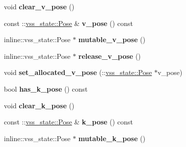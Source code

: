\begin{DoxyCompactItemize}
\item 
void {\bfseries clear\+\_\+v\+\_\+pose} ()\hypertarget{classvss__state_1_1Robot__State_ad7bb63ae44945655a400d71825c4e6cc}{}\label{classvss__state_1_1Robot__State_ad7bb63ae44945655a400d71825c4e6cc}

\item 
const \+::\hyperlink{classvss__state_1_1Pose}{vss\+\_\+state\+::\+Pose} \& {\bfseries v\+\_\+pose} () const \hypertarget{classvss__state_1_1Robot__State_af05253d869ead02f02a8ea56f0ec989f}{}\label{classvss__state_1_1Robot__State_af05253d869ead02f02a8ea56f0ec989f}

\item 
inline\+::vss\+\_\+state\+::\+Pose $\ast$ {\bfseries mutable\+\_\+v\+\_\+pose} ()\hypertarget{classvss__state_1_1Robot__State_ad5bd41bfe20e17c7c35a1cd91ff24a4a}{}\label{classvss__state_1_1Robot__State_ad5bd41bfe20e17c7c35a1cd91ff24a4a}

\item 
inline\+::vss\+\_\+state\+::\+Pose $\ast$ {\bfseries release\+\_\+v\+\_\+pose} ()\hypertarget{classvss__state_1_1Robot__State_a1d4e9041543747c034f54d98fd952d6e}{}\label{classvss__state_1_1Robot__State_a1d4e9041543747c034f54d98fd952d6e}

\item 
void {\bfseries set\+\_\+allocated\+\_\+v\+\_\+pose} (\+::\hyperlink{classvss__state_1_1Pose}{vss\+\_\+state\+::\+Pose} $\ast$v\+\_\+pose)\hypertarget{classvss__state_1_1Robot__State_a4e979918840ca68e80f7f602341ed766}{}\label{classvss__state_1_1Robot__State_a4e979918840ca68e80f7f602341ed766}

\item 
bool {\bfseries has\+\_\+k\+\_\+pose} () const \hypertarget{classvss__state_1_1Robot__State_a7754831605dadf0fa81b739f1ebf920d}{}\label{classvss__state_1_1Robot__State_a7754831605dadf0fa81b739f1ebf920d}

\item 
void {\bfseries clear\+\_\+k\+\_\+pose} ()\hypertarget{classvss__state_1_1Robot__State_a1adc3e3ef2845d0da77660cc3879969c}{}\label{classvss__state_1_1Robot__State_a1adc3e3ef2845d0da77660cc3879969c}

\item 
const \+::\hyperlink{classvss__state_1_1Pose}{vss\+\_\+state\+::\+Pose} \& {\bfseries k\+\_\+pose} () const \hypertarget{classvss__state_1_1Robot__State_a35253ee22b61da81e9bca8d0c3f338fc}{}\label{classvss__state_1_1Robot__State_a35253ee22b61da81e9bca8d0c3f338fc}

\item 
inline\+::vss\+\_\+state\+::\+Pose $\ast$ {\bfseries mutable\+\_\+k\+\_\+pose} ()\hypertarget{classvss__state_1_1Robot__State_ac807165c96cb5b59ae5341cc46f38996}{}\label{classvss__state_1_1Robot__State_ac807165c96cb5b59ae5341cc46f38996}


\end{DoxyCompactItemize}

